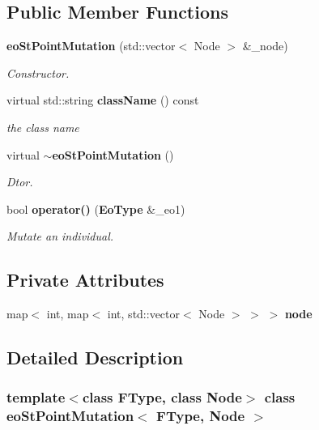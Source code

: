 \subsection*{Public Member Functions}
\begin{CompactItemize}
\item 
{\bf eo\-St\-Point\-Mutation} (std::vector$<$ Node $>$ \&\_\-node)
\begin{CompactList}\small\item\em Constructor. \item\end{CompactList}\item 
virtual std::string {\bf class\-Name} () const \label{classeo_st_point_mutation_a1}

\begin{CompactList}\small\item\em the class name \item\end{CompactList}\item 
virtual {\bf $\sim$eo\-St\-Point\-Mutation} ()\label{classeo_st_point_mutation_a2}

\begin{CompactList}\small\item\em Dtor. \item\end{CompactList}\item 
bool {\bf operator()} ({\bf Eo\-Type} \&\_\-eo1)
\begin{CompactList}\small\item\em Mutate an individual. \item\end{CompactList}\end{CompactItemize}
\subsection*{Private Attributes}
\begin{CompactItemize}
\item 
map$<$ int, map$<$ int, std::vector$<$ Node $>$ $>$ $>$ {\bf node}\label{classeo_st_point_mutation_r0}

\end{CompactItemize}


\subsection{Detailed Description}
\subsubsection*{template$<$class FType, class Node$>$ class eo\-St\-Point\-Mutation$<$ FType, Node $>$}

